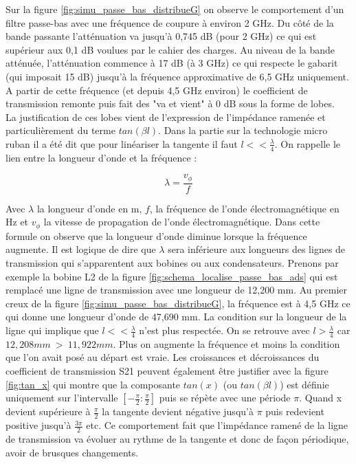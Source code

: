 \documentclass[french]{article}
\begin{document}
Sur la figure \ref{fig:simu_passe_bas_distribueG} on observe le comportement d'un filtre passe-bas avec une fréquence de coupure à environ 2 GHz. Du côté de la bande passante l'atténuation va jusqu'à 0,745 dB (pour 2 GHz) ce qui est supérieur aux 0,1 dB voulues par le cahier des charges. Au niveau de la bande atténuée, l'atténuation commence à 17 dB (à 3 GHz) ce qui respecte le gabarit (qui imposait 15 dB) jusqu'à la fréquence approximative de 6,5 GHz uniquement. A partir de cette fréquence (et depuis 4,5 GHz environ) le coefficient de transmission remonte puis fait des "va et vient" à 0 dB sous la forme de lobes.\\


La justification de ces lobes vient de l'expression de l'impédance ramenée et particulièrement du terme $tan(\beta l)$. Dans la partie sur la technologie micro ruban il a été dit que pour linéariser la tangente il faut $l << \frac{\lambda}{4}$. On rappelle le lien entre la longueur d'onde et la fréquence :

\begin{equation}
	\lambda = \frac{v_\phi}{f}
\end{equation}

Avec $\lambda$ la longueur d'onde en m, $f$, la fréquence de l'onde électromagnétique en Hz et $v_\phi$ la vitesse de propagation de l'onde électromagnétique. Dans cette formule on observe que la longueur d'onde diminue lorsque la fréquence augmente. Il est logique de dire que $\lambda$ sera inférieure aux longueurs des lignes de transmission qui s'apparentent aux bobines ou aux condensateurs. Prenons par exemple la bobine L2 de la figure \ref{fig:schema_localise_passe_bas_ads} qui est remplacé une ligne de transmission avec une longueur de 12,200 mm. Au premier creux de la figure \ref{fig:simu_passe_bas_distribueG}, la fréquence est à 4,5 GHz ce qui donne une longueur d'onde de 47,690 mm. La condition sur la longueur de la ligne qui implique que $l << \frac{\lambda}{4}$ n'est plus respectée. On se retrouve avec $l > \frac{\lambda}{4}$ car $12,208 mm\ >\ 11,922 mm$. Plus on augmente la fréquence et moins la condition que l'on avait posé au départ est vraie. Les croissances et décroissances du coefficient de transmission S21 peuvent également être justifier avec la figure \ref{fig:tan_x} qui montre que la composante $tan(x)$ (ou $tan(\beta l)$) est définie uniquement sur l'intervalle $[-\frac{\pi}{2}: \frac{\pi}{2}]$ puis se répète avec une période $\pi$. Quand x devient supérieure à $\frac{\pi}{2}$ la tangente devient négative jusqu'à $\pi$ puis redevient positive jusqu'à $\frac{3 \pi}{2}$ etc. Ce comportement fait que l'impédance ramené de la ligne de transmission va évoluer au rythme de la tangente et donc de façon périodique, avoir de brusques changements.\\
\end{document}
